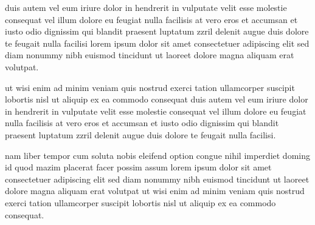 duis autem vel eum iriure dolor in hendrerit in vulputate velit esse
molestie consequat vel illum dolore eu feugiat nulla facilisis at vero eros
et accumsan et iusto odio dignissim qui blandit praesent luptatum zzril
delenit augue duis dolore te feugait nulla facilisi lorem ipsum dolor sit
amet consectetuer adipiscing elit sed diam nonummy nibh euismod tincidunt ut
laoreet dolore magna aliquam erat volutpat.

ut wisi enim ad minim veniam quis nostrud exerci tation ullamcorper suscipit
lobortis nisl ut aliquip ex ea commodo consequat duis autem vel eum iriure
dolor in hendrerit in vulputate velit esse molestie consequat vel illum
dolore eu feugiat nulla facilisis at vero eros et accumsan et iusto odio
dignissim qui blandit praesent luptatum zzril delenit augue duis dolore te
feugait nulla facilisi.

nam liber tempor cum soluta nobis eleifend option congue nihil imperdiet
doming id quod mazim placerat facer possim assum lorem ipsum dolor sit amet
consectetuer adipiscing elit sed diam nonummy nibh euismod tincidunt ut
laoreet dolore magna aliquam erat volutpat ut wisi enim ad minim veniam quis
nostrud exerci tation ullamcorper suscipit lobortis nisl ut aliquip ex ea
commodo consequat.
